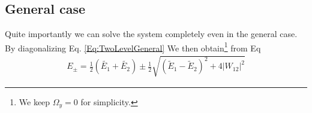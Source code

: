 \subsection{General case}

Quite importantly we can solve the system completely even in the general case. By diagonalizing  Eq. \eqref{Eq:TwoLevelGeneral} We then obtain\footnote{We keep $\Omega_y =0$ for simplicity.} from Eq
\begin{align}\label{eq:Epm}
 E_\pm = \frac{1}{2}\left(\tilde{E_1}+\tilde{E_2}\right) \pm \frac{1}{2} \sqrt{\left(\tilde{E}_1-\tilde{E}_2\right)^2+4 \left|W_{12}\right|^2}
\end{align}